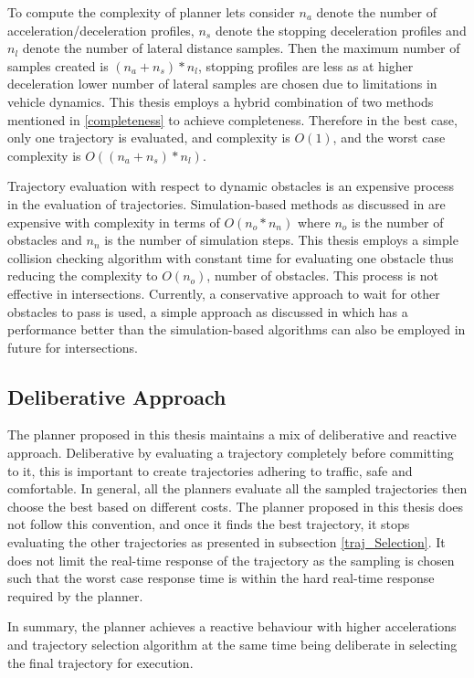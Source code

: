 To compute the complexity of planner lets consider $n_a$ denote the number of acceleration/deceleration profiles, $n_s$ denote the stopping deceleration profiles and $n_l$ denote the number of lateral distance samples. Then the maximum number of samples created is $(n_a+n_s)*n_l$, stopping profiles are less as at higher deceleration lower number of lateral samples are chosen due to limitations in vehicle dynamics. This thesis employs a hybrid combination of two methods mentioned in \ref{completeness} to achieve completeness. Therefore in the best case, only one trajectory is evaluated, and complexity is $O(1)$, and the worst case complexity is $O((n_a+n_s)*n_l)$.

Trajectory evaluation with respect to dynamic obstacles is an expensive process in the evaluation of trajectories. Simulation-based methods as discussed in  \cite{kolski_thesis} are expensive with complexity in terms of $O(n_o*n_n)$ where $n_o$ is the number of obstacles and $n_n$ is the number of simulation steps. This thesis employs a simple collision checking algorithm with constant time for evaluating one obstacle thus reducing the complexity to $O(n_o)$, number of obstacles. This process is not effective in intersections. Currently, a conservative approach to wait for other obstacles to pass is used, a simple approach as discussed in \cite{rrt_star} which has a performance better than the simulation-based algorithms can also be employed in future for intersections.  

\subsection{Deliberative Approach}
The planner proposed in this thesis maintains a mix of deliberative and reactive approach. Deliberative by evaluating a trajectory completely before committing to it, this is important to create trajectories adhering to traffic, safe and comfortable. In general, all the planners evaluate all the sampled trajectories then choose the best based on different costs. The planner proposed in this thesis does not follow this convention, and once it finds the best trajectory, it stops evaluating the other trajectories as presented in subsection \ref{traj_Selection}. It does not limit the real-time response of the trajectory as the sampling is chosen such that the worst case response time is within the hard real-time response required by the planner. 

In summary, the planner achieves a reactive behaviour with higher accelerations and trajectory selection algorithm at the same time being deliberate in selecting the final trajectory for execution. 

